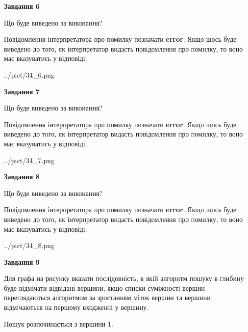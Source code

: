 \documentclass[12pt, ukrainian]{article}
\begin{document}
{\begin {large}
{\begin {center}\textbf{Завдання 6}\end {center}}\par
Що буде виведено за виконання?

Повідомлення інтерпретатора про помилку позначати \textbf{error}.
Якщо щось буде виведено до того, як інтерпретатор видасть повідомлення про помилку, 
то воно має вказуватись у відповіді. \par


\begin{center}
	{../pict/34_6.png}
\end{center}
\newpage

{\begin {center}\textbf{Завдання 7}\end {center}}\par
Що буде виведено за виконання?

Повідомлення інтерпретатора про помилку позначати \textbf{error}.
Якщо щось буде виведено до того, як інтерпретатор видасть повідомлення про помилку, 
то воно має вказуватись у відповіді. \par


\begin{center}
	{../pict/34_7.png}
\end{center}
\newpage

{\begin {center}\textbf{Завдання 8}\end {center}}\par
Що буде виведено за виконання?

Повідомлення інтерпретатора про помилку позначати \textbf{error}.
Якщо щось буде виведено до того, як інтерпретатор видасть повідомлення про помилку, 
то воно має вказуватись у відповіді. \par


\begin{center}
	{../pict/34_8.png}
\end{center}
\newpage

{\begin {center}\textbf{Завдання 9}\end {center}}\par
Для графа на рисунку вказати послідовність, в якій алгоритм пошуку в глибину буде відмічати відвідані вершини, якщо списки суміжності вершин переглядаються алгоритмом за зростанням міток вершин та вершини відмічаються на першому вход\-женні у вершину.\par
Пошук розпочинається з вершини 1.\par


\end{large}}
\end{document}
